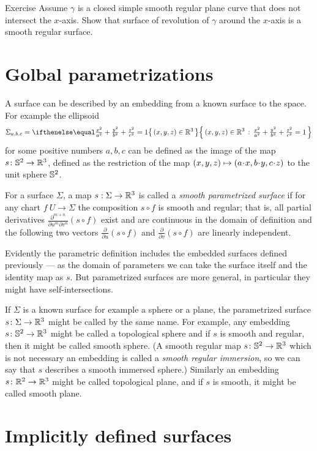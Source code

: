 \begin{thm}{Exercise}\label{ex:revolution}
Assume $\gamma$ is a closed simple smooth regular plane curve that does not intersect the $x$-axis.
Show that surface of revolution of $\gamma$ around the $x$-axis is a smooth regular surface.
\end{thm}


\section*{Golbal parametrizations} 
A surface can be described by an embedding from a known surface to the space.
For example the ellipsoid
\[\Sigma_{a,b,c}=\set{(x,y,z)\in\RR^3}{\tfrac{x^2}{a^2}+\tfrac{y^2}{b^2}+\tfrac{z^2}{c^2}=1}\]
for some positive numbers $a,b,c$ can be defined as the image of the map $s\colon\mathbb{S}^2\to\mathbb{R}^3$, defined as the restriction of the map $(x,y,z)\z\mapsto (a\cdot x, b\cdot y,c\cdot z)$ to the unit sphere $\mathbb{S}^2$.

For a surface $\Sigma$, a map $s: \Sigma \to \mathbb{R} ^3$ is called a 
\emph{smooth parametrized surface} if for any chart $f\:U\to \Sigma$ 
the composition $s\circ f$ is smooth and regular;
that is, all partial derivatives $\frac{\partial^{m+n}}{\partial u^m\partial v^n}(s\circ f)$ exist and are continuous in the domain of definition and the following two vectors 
$\frac{\partial}{\partial u}(s\circ f)$ and $\frac{\partial}{\partial v}(s\circ f)$ are linearly independent.

Evidently the parametric definition includes the embedded surfaces defined previously --- as the domain of parameters we can take the surface itself and the identity map as $s$.
But parametrized surfaces are more general, in particular they  might  have self-intersections.

If $\Sigma$ is a known surface for example a sphere or a plane, the parametrized surface $s\colon\Sigma\to\mathbb{R}^3$ might be called by the same name.
For example, any embedding $s\colon\mathbb{S}^2\to\mathbb{R}^3$ might be called a topological sphere
and if $s$ is smooth and regular, then it might be called smooth sphere.
(A smooth regular map $s\colon\mathbb{S}^2\to\mathbb{R}^3$ which is not necessary an embedding is called a \emph{smooth regular immersion}, so we can say that $s$ describes a smooth immersed sphere.) 
Similarly an embedding $s\colon\mathbb{R}^2\to\mathbb{R}^3$ might be called topological plane,
and if $s$ is smooth, it might be called smooth plane.

\section*{Implicitly defined surfaces}

